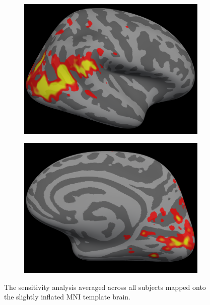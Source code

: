 \documentclass[preprint,authoryear,12pt]{elsarticle}
\begin{document}
\begin{figure}
\begin{subfigure}{0.4\textwidth}
\includegraphics[width=\textwidth]{figures/rh-lateral-smax-average}
\caption{}
\label{fig:rh-lateral-smax-average}
\end{subfigure}
\begin{subfigure}{0.4\textwidth}
\centering
\includegraphics[width=\textwidth]{figures/rh-medial-smax-average}
\caption{}
\label{fig:rh-medial-smax-average}
\end{subfigure}
\caption{The sensitivity analysis averaged across all subjects mapped onto the slightly inflated MNI template brain.}
\label{fig:MNI-average-sensitivity}
\end{figure}
\end{document}
